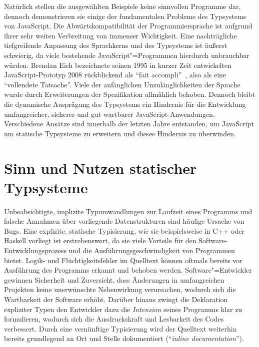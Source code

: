 Natürlich stellen die ausgewählten Beispiele keine sinnvollen Programme dar, dennoch demonstrieren sie einige der fundamentalen Probleme des Typsystems von JavaScript. Die Abwärtskompatibilität der Programmiersprache ist aufgrund ihrer sehr weiten Verbreitung von immenser Wichtigkeit. Eine nachträgliche tiefgreifende Anpassung des Sprachkerns und des Typsystems ist äußerst schwierig, da viele bestehende JavaScript"=Programmen hierdurch unbrauchbar würden. Brendan Eich bezeichnete seinen 1995 in kurzer Zeit entwickelten JavaScript-Prototyp 2008 rückblickend als \enquote{fait accompli}~\autocite{EICH:POPULARITY}, also als eine \enquote{vollendete Tatsache}. Viele der anfänglichen Unzulänglichkeiten der Sprache wurde durch Erweiterungen der Spezifikation allmählich behoben. Dennoch bleibt die dynamische Ausprägung des Typsystems ein Hindernis für die Entwicklung umfangreicher, sicherer und gut wartbarer JavaScript-Anwendungen. Verschiedene Ansätze sind innerhalb der letzten Jahre entstanden, um JavaScript um statische Typsysteme zu erweitern und dieses Hindernis zu überwinden.

\section{Sinn und Nutzen statischer Typsysteme}

Unbeabsichtigte, implizite Typumwandlungen zur Laufzeit eines Programms und falsche Annahmen über vorliegende Datenstrukturen sind häufige Ursache von Bugs. Eine explizite, statische Typisierung, wie sie beispielsweise in C++ oder Haskell vorliegt ist erstrebenswert, da sie viele Vorteile für den Software-Entwicklungsprozess und die Ausführungsgeschwindigkeit von Programmen bietet.
Logik- und Flüchtigkeitsfehler im Quelltext können oftmals bereits vor Ausführung des Programms erkannt und behoben werden. Software"=Entwickler gewinnen Sicherheit und Zuversicht, dass Änderungen in umfangreichen Projekten keine unerwünschte Nebenwirkung verursachen, wodurch sich die Wartbarkeit der Software erhöht. Darüber hinaus zwingt die Deklaration expliziter Typen den Entwickler dazu die \emph{Intension} seines Programms klar zu formulieren, wodurch sich die Ausdruckskraft und Lesbarkeit des Codes verbessert. Durch eine vernünftige Typisierung wird der Quelltext weiterhin bereits grundlegend an Ort und Stelle dokumentiert (\enquote{\textit{inline documentation}}).


